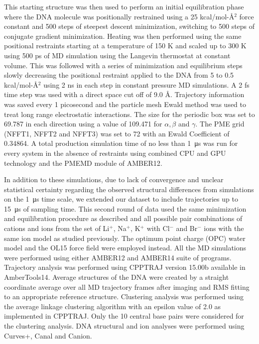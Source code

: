 \documentclass[9pt,lessons]{livecoms}
\begin{document}
This starting structure was then used to perform an initial
equilibration phase where the DNA molecule was positionally restrained
using a 25 kcal/mol-Å$^2$ force constant and 500 steps of steepest
descent minimization, switching to 500 steps of conjugate gradient
minimization. Heating was then performed using the same positional
restraints starting at a temperature of 150 K and scaled up to 300 K
using 500 ps of MD simulation using the Langevin\cite{Pastor1988}
thermostat at constant volume. This was followed with a series of
minimization and equilibrium steps slowly decreasing the positional
restraint applied to the DNA from 5 to 0.5 kcal/mol-Å$^2$ using 2 ns
in each step in constant pressure MD simulations. A 2 fs time step was
used with a direct space cut off of 9.0 Å. Trajectory information was
saved every 1 picosecond and the particle mesh Ewald\cite{Darden1993}
method was used to treat long range electrostatic interactions. The
size for the periodic box was set to 69.787 in each direction using a
value of 109.471 for $\alpha,\beta$ and $\gamma$. The PME grid (NFFT1,
NFFT2 and NFFT3) was set to 72 with an Ewald Coefficient of 0.34864. A
total production simulation time of no less than \SI{1}{\micro\second}
was run for every system in the absence of restraints using combined
CPU and GPU technology and the PMEMD module of
AMBER12\cite{Goetz2012}.

In addition to these simulations, due to lack of convergence and
unclear statistical certainty regarding the observed structural
differences from simulations on the \SI{1}{\micro\second} time
scale\cite{Galindo-Murillo2014,Galindo-Murillo2014a}, we extended our
dataset to include trajectories up to \SI{15}{\micro\second} of
sampling time. This second round of data used the same minimization
and equilibration procedure as described and all possible pair
combinations of cations and ions from the set of Li$^{+}$, Na$^{+}$,
K$^{+}$ with Cl$^{-}$ and Br$^{-}$ ions with the same ion model as
studied previously.  The optimum point charge (OPC\cite{Izadi2014})
water model and the OL15\cite{Galindo-Murillo2016} force field were
employed instead. All the MD simulations were performed using either
AMBER12 and AMBER14\cite{Case2005} suite of programs.  Trajectory
analysis was performed using CPPTRAJ version 15.00b available in
AmberTools14\cite{Roe2013,Roe2018}. Average structures of the DNA were
created by a straight coordinate average over all MD trajectory frames
after imaging and RMS fitting to an appropriate reference structure. Clustering analysis was performed using the average linkage clustering algorithm\cite{shao2007} with an epsilon value of 2.0 as
implemented in CPPTRAJ. Only the 10 central base pairs were considered for the clustering analysis.
DNA structural and ion analyses were performed using Curves+, Canal and
Canion\cite{Lavery2014,Lavery2009}.
\end{document}
